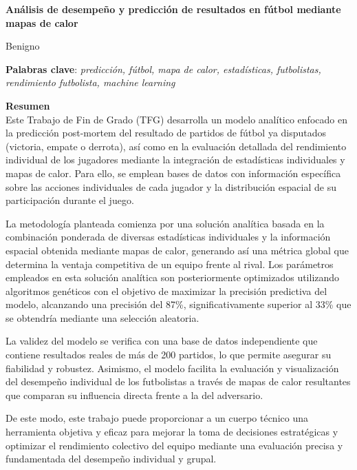 \thispagestyle{empty}

\begin{center}
{\large\bfseries Análisis de desempeño y predicción
de resultados en fútbol mediante
mapas de calor }\\
\end{center}
\begin{center}
Benigno\\
\end{center}


\vspace{0.5cm}
\noindent\textbf{Palabras clave}: \textit{predicción, fútbol, mapa de calor, estadísticas, futbolistas, rendimiento futbolista, \textit{machine learning}}
\vspace{0.7cm}

\noindent\textbf{Resumen}\\
Este Trabajo de Fin de Grado (TFG) desarrolla un modelo analítico enfocado en la predicción post-mortem del resultado de partidos de fútbol ya disputados (victoria, empate o derrota), así como en la evaluación detallada del rendimiento individual de los jugadores mediante la integración de estadísticas individuales y mapas de calor. Para ello, se emplean bases de datos con información específica sobre las acciones individuales de cada jugador y la distribución espacial de su participación durante el juego.

La metodología planteada comienza por una solución analítica basada en la combinación ponderada de diversas estadísticas individuales y la información espacial obtenida mediante mapas de calor, generando así una métrica global que determina la ventaja competitiva de un equipo frente al rival. Los parámetros empleados en esta solución analítica son posteriormente optimizados utilizando algoritmos genéticos con el objetivo de maximizar la precisión predictiva del modelo, alcanzando una precisión del 87\%, significativamente superior al 33\% que se obtendría mediante una selección aleatoria.

La validez del modelo se verifica con una base de datos independiente que contiene resultados reales de más de 200 partidos, lo que permite asegurar su fiabilidad y robustez. Asimismo, el modelo facilita la evaluación y visualización del desempeño individual de los futbolistas a través de mapas de calor resultantes que comparan su influencia directa frente a la del adversario.

De este modo, este trabajo puede proporcionar a un cuerpo técnico una herramienta objetiva y eficaz para mejorar la toma de decisiones estratégicas y optimizar el rendimiento colectivo del equipo mediante una evaluación precisa y fundamentada del desempeño individual y grupal.

